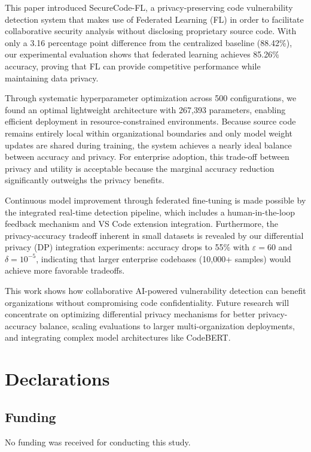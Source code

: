 \documentclass[pdflatex,sn-mathphys-num]{sn-jnl}
\theoremstyle{thmstyleone}%
\theoremstyle{thmstyletwo}%
\theoremstyle{thmstylethree}%
\begin{document}
This paper introduced SecureCode-FL, a privacy-preserving code vulnerability detection system that makes use of Federated Learning (FL) in order to facilitate collaborative security analysis without disclosing proprietary source code. With only a 3.16 percentage point difference from the centralized baseline (88.42\%), our experimental evaluation shows that federated learning achieves 85.26\% accuracy, proving that FL can provide competitive performance while maintaining data privacy.

Through systematic hyperparameter optimization across 500 configurations, we found an optimal lightweight architecture with 267,393 parameters, enabling efficient deployment in resource-constrained environments. Because source code remains entirely local within organizational boundaries and only model weight updates are shared during training, the system achieves a nearly ideal balance between accuracy and privacy. For enterprise adoption, this trade-off between privacy and utility is acceptable because the marginal accuracy reduction significantly outweighs the privacy benefits.

Continuous model improvement through federated fine-tuning is made possible by the integrated real-time detection pipeline, which includes a human-in-the-loop feedback mechanism and VS Code extension integration. Furthermore, the privacy-accuracy tradeoff inherent in small datasets is revealed by our differential privacy (DP) integration experiments: accuracy drops to 55\% with $\varepsilon=60$ and $\delta=10^{-5}$, indicating that larger enterprise codebases (10,000+ samples) would achieve more favorable tradeoffs.

This work shows how collaborative AI-powered vulnerability detection can benefit organizations without compromising code confidentiality. Future research will concentrate on optimizing differential privacy mechanisms for better privacy-accuracy balance, scaling evaluations to larger multi-organization deployments, and integrating complex model architectures like CodeBERT.

\backmatter
\section{Declarations}

\subsection{Funding}
No funding was received for conducting this study.
\end{document}

